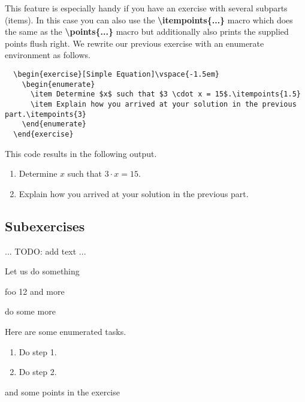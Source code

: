 \documentclass[
  twocolumn,%
  fontsize=9pt,%
  DIV=calc,%
  numbers=noendperiod%
]{scrartcl}
\begin{document}
This feature is especially handy if you have an exercise with several subparts (items). In this case you can also use the \textcolor{NavyBlue}{\ttfamily\bfseries \textbackslash itempoints\{...\}} macro which does the same as the \textcolor{NavyBlue}{\ttfamily\bfseries \textbackslash points\{...\}} macro but additionally also prints the supplied points flush right. We rewrite our previous exercise with an enumerate environment as follows.

\begin{lstlisting}
  \begin{exercise}[Simple Equation]\vspace{-1.5em}
    \begin{enumerate}
      \item Determine $x$ such that $3 \cdot x = 15$.\itempoints{1.5}
      \item Explain how you arrived at your solution in the previous part.\itempoints{3}
    \end{enumerate}
  \end{exercise} 
\end{lstlisting}

\noindent This code results in the following output.
\begin{exercise}\vspace{-1.5em}
  \begin{enumerate}
    \item Determine $x$ such that $3 \cdot x = 15$.
    \item Explain how you arrived at your solution in the previous part.
  \end{enumerate}
\end{exercise}

\subsection{Subexercises}
... TODO: add text ...  

\begin{exercise}
  Let us do something
  \begin{subexercise}
    foo 12 
    and more 
  \end{subexercise}

  \begin{subexercise}
    do some more
  \end{subexercise}

  \begin{subexercise}
    Here are some enumerated tasks.
    \begin{enumerate}
      \item Do step 1.
      \item Do step 2. 
    \end{enumerate}
  \end{subexercise}

  and some points in the exercise 
\end{exercise}
\end{document}
